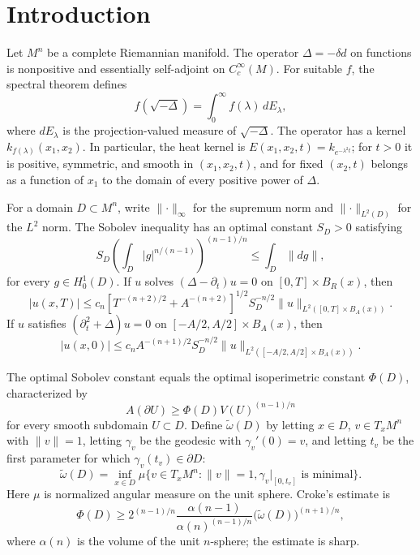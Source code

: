 \chapter{Introduction}

Let $M^n$ be a complete Riemannian manifold. The operator
$\Delta=-\delta d$ on functions is nonpositive and essentially self-adjoint on
$C_c^\infty(M)$. For suitable $f$, the spectral theorem defines
\begin{equation}
f(\sqrt{-\Delta})=\int_0^\infty f(\lambda)\,dE_\lambda,
\tag{0.1}
\end{equation}
where $dE_\lambda$ is the projection-valued measure of $\sqrt{-\Delta}$.
The operator has a kernel $k_{f(\lambda)}(x_1,x_2)$. In particular, the heat
kernel is $E(x_1,x_2,t)=k_{e^{-\lambda^2t}}$; for $t>0$ it is positive, symmetric,
and smooth in $(x_1,x_2,t)$, and for fixed $(x_2,t)$ belongs as a function of
$x_1$ to the domain of every positive power of $\Delta$.

For a domain $D\subset M^n$, write $\lVert\cdot\rVert_\infty$ for the supremum
norm and $\lVert\cdot\rVert_{L^2(D)}$ for the $L^2$ norm. The Sobolev inequality
has an optimal constant $S_D>0$ satisfying
\begin{equation}
S_D\left(\int_D|g|^{n/(n-1)}\right)^{(n-1)/n}
\leq \int_D\lVert dg\rVert,
\tag{0.2}
\end{equation}
for every $g\in H_0^1(D)$. If $u$ solves
$(\Delta-\partial_t)u=0$ on $[0,T]\times B_R(x)$, then
\begin{equation}
|u(x,T)|\leq c_n\left[T^{-(n+2)/2}+A^{-(n+2)}\right]^{1/2}S_D^{-n/2}
\lVert u\rVert_{L^2([0,T]\times B_A(x))}.
\tag{0.3}
\end{equation}
If $u$ satisfies $(\partial_t^2+\Delta)u=0$ on
$[-A/2,A/2]\times B_A(x)$, then
\begin{equation}
|u(x,0)|\leq c_nA^{-(n+1)/2}S_D^{-n/2}
\lVert u\rVert_{L^2([-A/2,A/2]\times B_A(x))}.
\tag{0.3'}
\end{equation}

The optimal Sobolev constant equals the optimal isoperimetric constant
$\Phi(D)$, characterized by
\begin{equation}
A(\partial U)\geq \Phi(D)V(U)^{(n-1)/n}
\tag{0.4}
\end{equation}
for every smooth subdomain $U\subset D$. Define $\widetilde\omega(D)$ by
letting $x\in D$, $v\in T_xM^n$ with $\lVert v\rVert=1$, letting $\gamma_v$ be
the geodesic with $\gamma_v'(0)=v$, and letting $t_v$ be the first parameter
for which $\gamma_v(t_v)\in\partial D$:
\begin{equation}
\widetilde\omega(D)=\inf_{x\in D}\mu\{v\in T_xM^n:\lVert v\rVert=1,
\gamma_v|_{[0,t_v]}\text{ is minimal}\}.
\tag{0.5}
\end{equation}
Here $\mu$ is normalized angular measure on the unit sphere. Croke's estimate is
\begin{equation}
\Phi(D)\geq 2^{(n-1)/n}\frac{\alpha(n-1)}{\alpha(n)^{(n-1)/n}}
\bigl(\widetilde\omega(D)\bigr)^{(n+1)/n},
\tag{0.6}
\end{equation}
where $\alpha(n)$ is the volume of the unit $n$-sphere; the estimate is sharp.

